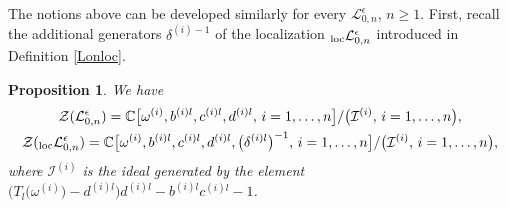 \documentclass[pdftex]{sigma}%
\numberwithin{equation}{section}
\numberwithin{figure}{section}
\newtheorem{prop}[teo]{Proposition}
\newcommand{\e}{\epsilon}
\newcommand{\mc}{\mathbb{C}}
\newcommand{\Ll}{{\mathcal L}}
\begin{document}
The notions above can be developed similarly for every $\Ll_{0,n}^\e$, $n\geq 1$. First, recall the additional generators $\delta^{(i)-1}$ of the localization ${}_{\rm loc}\Ll_{0,n}^\e$ introduced in Definition \ref{Lonloc}.
\begin{prop} \label{center0nroot}
We have
\begin{gather*}
\mathcal{Z}(\Ll_{0,n}^\e) =\mc\big[\omega^{(i)},b^{(i)l},c^{(i)l},d^{(i)l},\, i=1,\dots, n\big]/\big(\mathcal{I}^{(i)},\, i=1,\dots, n\big),
\\
\mathcal{Z}({}_{\rm loc}\Ll_{0,n}^\e) = \mc\big[\omega^{(i)},b^{(i)l},c^{(i)l},d^{(i) l}, \big(\delta^{(i)l}\big)^{-1},\, i=1,\dots, n\big]/\big(\mathcal{I}^{(i)},\, i=1,\dots, n\big),
\end{gather*}
 where $\mathcal{I}^{(i)}$ is the ideal generated by the element $\big(T_l\big(\omega^{(i)}\big) - d^{(i)l}\big)d^{(i)l} - b^{(i)l}c^{(i)l} - 1$.%
\end{prop}
\end{document}
